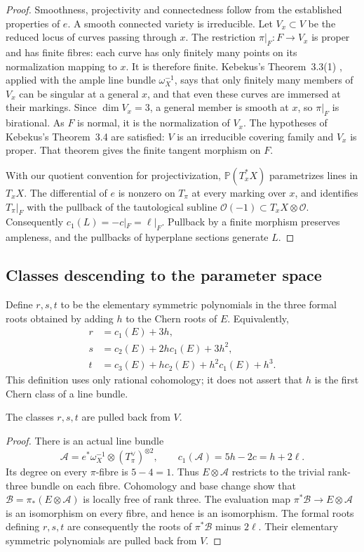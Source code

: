 \begin{proof}
Smoothness, projectivity and connectedness follow from the established
properties of $e$.  A smooth connected variety is irreducible.
Let $V_x\subset V$ be the reduced locus of curves passing through $x$.
The restriction $\pi|_F\colon F\to V_x$ is proper and has finite fibres:
each curve has only finitely many points on its normalization mapping to
$x$.  It is therefore finite.  Kebekus's Theorem~3.3(1)
\cite{Kebekus2002}, applied with the ample line bundle
$\omega_X^{-1}$, says that only finitely many members of $V_x$ can be
singular at a general $x$, and that even these curves are immersed at
their markings.  Since $\dim V_x=3$, a general member is smooth at $x$,
so $\pi|_F$ is birational.  As $F$ is normal, it is the normalization of
$V_x$.  The hypotheses of Kebekus's Theorem~3.4 are satisfied: $V$ is an
irreducible covering family and $V_x$ is proper.  That theorem gives the
finite tangent morphism on $F$.

With our quotient convention for projectivization,
$\mathbb P(T_x^*X)$ parametrizes lines in $T_xX$.  The differential of
$e$ is nonzero on $T_\pi$ at every marking over $x$, and identifies
$T_\pi|_F$ with the pullback of the tautological subline
$\mathcal O(-1)\subset T_xX\otimes\mathcal O$.  Consequently
$c_1(L)=-c|_F=\ell|_F$.  Pullback by a finite morphism preserves
ampleness, and the pullbacks of hyperplane sections generate $L$.
\end{proof}

\subsection{Classes descending to the parameter space}

Define $r,s,t$ to be the elementary symmetric polynomials in the three
formal roots obtained by adding $h$ to the Chern roots of $E$.
Equivalently,
\begin{align*}
 r&=c_1(E)+3h,\\
 s&=c_2(E)+2hc_1(E)+3h^2,\\
 t&=c_3(E)+hc_2(E)+h^2c_1(E)+h^3.
\end{align*}
This definition uses only rational cohomology; it does not assert that
$h$ is the first Chern class of a line bundle.

\begin{lemma}\label{lem:shifted-descent}
The classes $r,s,t$ are pulled back from $V$.
\end{lemma}
\begin{proof}
There is an actual line bundle
\[
 \mathcal A=e^*\omega_X^{-1}\otimes(T_\pi^\vee)^{\otimes2},
 \qquad c_1(\mathcal A)=5h-2c=h+2\ell.
\]
Its degree on every $\pi$-fibre is $5-4=1$.
Thus $E\otimes\mathcal A$ restricts to the trivial rank-three bundle
on each fibre. Cohomology and base change show that
$\mathcal B=\pi_*(E\otimes\mathcal A)$ is locally free of rank three.
The evaluation map $\pi^*\mathcal B\to E\otimes\mathcal A$ is an
isomorphism on every fibre, and hence is an isomorphism.
The formal roots defining $r,s,t$ are consequently the roots of
$\pi^*\mathcal B$ minus $2\ell$. Their elementary symmetric
polynomials are pulled back from $V$.
\end{proof}

